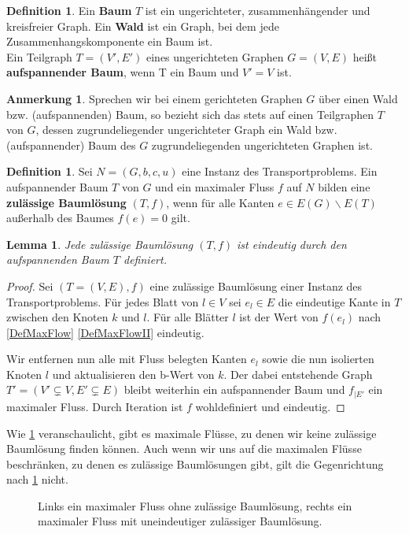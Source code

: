 \documentclass[a4paper,twoside,ngerman]{report}
\theoremstyle{plain}
\newtheorem{lem}[thm]{Lemma}
\theoremstyle{definition}
\newtheorem{defn}[thm]{Definition}
\newtheorem*{anm}{Anmerkung}
\begin{document}
\begin{defn}Ein \textbf{Baum} $T$ ist ein ungerichteter, zusammenhängender und kreisfreier Graph. Ein \textbf{Wald} ist ein Graph, bei dem jede Zusammenhangskomponente ein Baum ist.\\
Ein Teilgraph $T=(V',E')$ eines ungerichteten Graphen $G=(V,E)$ heißt \textbf{aufspannender Baum}, wenn T ein Baum und $V'=V$ ist.\end{defn}
\begin{anm}Sprechen wir bei einem gerichteten Graphen $G$ über einen Wald bzw. (aufspannenden) Baum, so bezieht sich das stets auf einen Teilgraphen $T$ von $G$, dessen zugrundeliegender ungerichteter Graph ein Wald bzw. (aufspannender) Baum des $G$ zugrundeliegenden ungerichteten Graphen ist.\end{anm}

\begin{defn}Sei $N=(G,b,c,u)$ eine Instanz des Transportproblems. Ein aufspannender Baum $T$ von $G$ und ein maximaler Fluss $f$ auf $N$ bilden eine \textbf{zulässige Baumlösung} $(T,f)$, wenn für alle Kanten $e\in E(G)\backslash E(T)$ außerhalb des Baumes $f(e) = 0$ gilt.\end{defn}

\begin{lem}\label{TreeUnique}Jede zulässige Baumlösung $(T,f)$ ist eindeutig durch den aufspannenden Baum $T$ definiert.\end{lem}
\begin{proof}Sei $(T=(V,E),f)$ eine zulässige Baumlösung einer Instanz des Transportproblems. Für jedes Blatt von $l\in V$ sei $e_l\in E$ die eindeutige Kante in $T$ zwischen den Knoten $k$ und $l$. Für alle Blätter $l$ ist der Wert von $f(e_l)$ nach \cref{DefMaxFlow} \cref{DefMaxFlowII} eindeutig.
	
Wir entfernen nun alle mit Fluss belegten Kanten $e_l$ sowie die nun isolierten Knoten $l$ und aktualisieren den b-Wert von $k$. Der dabei entstehende Graph $T'=(V'\subsetneq V,E'\subsetneq E)$ bleibt weiterhin ein aufspannender Baum und $f_{|E'}$ ein maximaler Fluss. Durch Iteration ist $f$ wohldefiniert und eindeutig.\end{proof}

Wie \cref{fig:BL} veranschaulicht, gibt es maximale Flüsse, zu denen wir keine zulässige Baumlösung finden können. Auch wenn wir uns auf die maximalen Flüsse beschränken, zu denen es zulässige Baumlösungen gibt, gilt die Gegenrichtung nach \cref{fig:BL} nicht.

\begin{figure}[!ht]\centering

\caption{Links ein maximaler Fluss ohne zulässige Baumlösung, rechts ein maximaler Fluss mit uneindeutiger zulässiger Baumlösung.}
\label{fig:BL}
\end{figure}	
\end{document}
